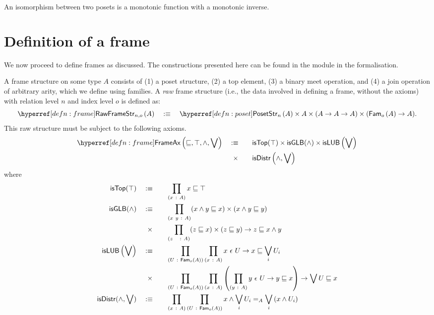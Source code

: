 \begin{defn}
  An isomorphism between two posets is a monotonic function with a monotonic inverse.
\end{defn}

\section{Definition of a frame}\label{sec:frame}

We now proceed to define frames as discussed. The constructions presented here can be
found in the  module in the \veragda{} formalisation.
\begin{defn}[Frame]\label{defn:frame}
  A frame structure on some type $A$ consists of (1) a poset structure, (2) a top element,
  (3) a binary meet operation, and (4) a join operation of arbitrary arity, which we
  define using families. A \emph{raw} frame structure (i.e., the data involved in defining
  a frame, without the axioms) with relation level $n$ and index level $o$ is defined as:
  \begin{equation*}
    \rawframestr{n}{o}{A} \quad\is\quad \posetstr{n}{A} \times A \times (A \rightarrow A \rightarrow A) \times (\sub{o}{A} \rightarrow A).
  \end{equation*}
  This raw structure must be subject to the following axioms.
  \begin{alignat*}{2}
    \frameax{\sqsubseteq, \top, \wedge, \bigvee} \quad&\is\quad             &&\mathsf{isTop}(\top) \times
                                              \mathsf{isGLB}(\wedge) \times
                                              \mathsf{isLUB}\left( \bigvee \right)\\
                          &\hspace{0.55em}\times &&\mathsf{isDistr}\left( \wedge, \bigvee \right)
  \end{alignat*}
  where
  \begin{alignat*}{2}
    \mathsf{isTop}(\top) \quad&\is\quad &&\pity{x}{A}{x \sqsubseteq \top}\\
    \mathsf{isGLB}(\wedge) \quad&\is\quad &&\pity{x~y}{A}{(x \wedge y \sqsubseteq x) \times (x \wedge y \sqsubseteq y)}\\
                       &\hspace{0.55em}\times &&\pity{z~~}{A}{(z \sqsubseteq x) \times (z \sqsubseteq y) \rightarrow z \sqsubseteq x \wedge y}\\
    \mathsf{isLUB}\left(\bigvee\right) \quad&\is\quad
         &&\pity{U}{\sub{o}{A}}{\pity{x}{A}{\memfam{x}{U} \rightarrow x \sqsubseteq \bigvee_i U_i}}\\
         &\hspace{0.55em}\times &&\pity{U}{\sub{o}{A}}{\pity{x}{A}{
        \left( \pity{y}{A}{\memfam{y}{U} \rightarrow y \sqsubseteq x}\right) \rightarrow \bigvee U \sqsubseteq x }}\\
    \mathsf{isDistr}(\wedge, \bigvee) \quad&\is\quad
      &&\pity{x}{A}{\pity{U}{\sub{o}{A}}{
          x \wedge \bigvee_i U_i} =_A \bigvee_i \left( x \wedge U_i \right)
      }
  \end{alignat*}
\end{defn}

